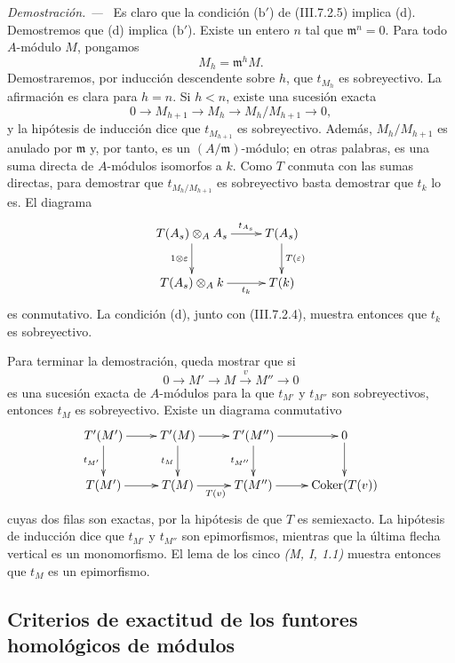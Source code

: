 \documentclass[10pt,oneside]{book}
\newcommand{\Coker}{\operatorname{Coker}}
\newcommand{\sref}[2][]{\textup{(#2)}}
\newcommand{\oldpage}[2][]{\setcounter{footnote}{0}\marginpar{\scriptsize\textbf{#1}~|~#2}\ignorespaces}
\newenvironment{proof}{\par\medskip\noindent\textit{Demostración. ---\ }}{\par}
\begin{document}
\begin{proof}
\oldpage[III]{180}
Es claro que la condición ($\mathrm{b}'$) de
\sref{III.7.2.5} implica (d). Demostremos que (d) implica
($\mathrm{b}'$). Existe un entero $n$ tal que
$\mathfrak m^n=0$. Para todo $A$-módulo $M$, pongamos
\[
  M_h=\mathfrak m^hM.
\]
Demostraremos, por inducción descendente sobre $h$, que $t_{M_h}$
es sobreyectivo. La afirmación es clara para $h=n$. Si $h<n$,
existe una sucesión exacta
\[
  0\longrightarrow M_{h+1}
  \longrightarrow M_h
  \longrightarrow M_h/M_{h+1}
  \longrightarrow0,
\]
y la hipótesis de inducción dice que $t_{M_{h+1}}$ es
sobreyectivo. Además, $M_h/M_{h+1}$ es anulado por $\mathfrak m$
y, por tanto, es un $(A/\mathfrak m)$-módulo; en otras palabras,
es una suma directa de $A$-módulos isomorfos a $k$. Como $T$
conmuta con las sumas directas, para demostrar que
$t_{M_h/M_{h+1}}$ es sobreyectivo basta demostrar que $t_k$ lo es.
El diagrama
\[
\xymatrix{
  T(A_s)\otimes_A A_s
    \ar[r]^-{t_{A_s}}\ar[d]_{1\otimes\varepsilon}
  & T(A_s)\ar[d]^{T(\varepsilon)}
  \\
  T(A_s)\otimes_A k
    \ar[r]_-{t_k}
  & T(k)
}
\]
es conmutativo. La condición (d), junto con
\sref{III.7.2.4}, muestra entonces que $t_k$ es sobreyectivo.

Para terminar la demostración, queda mostrar que si
\[
  0\longrightarrow M'
  \longrightarrow M
  \xrightarrow{v}M''
  \longrightarrow0
\]
es una sucesión exacta de $A$-módulos para la que $t_{M'}$ y
$t_{M''}$ son sobreyectivos, entonces $t_M$ es sobreyectivo.
Existe un diagrama conmutativo
\[
\xymatrix{
  T'(M')\ar[r]\ar[d]_{t_{M'}}
  & T'(M)\ar[r]\ar[d]_{t_M}
  & T'(M'')\ar[r]\ar[d]_{t_{M''}}
  & 0\ar[d]
  \\
  T(M')\ar[r]
  & T(M)\ar[r]_{T(v)}
  & T(M'')\ar[r]
  & \Coker(T(v))
}
\]
cuyas dos filas son exactas, por la hipótesis de que $T$ es
semiexacto. La hipótesis de inducción dice que $t_{M'}$ y
$t_{M''}$ son epimorfismos, mientras que la última flecha vertical
es un monomorfismo. El lema de los cinco \emph{(M, I, 1.1)}
muestra entonces que $t_M$ es un epimorfismo.
\end{proof}

\subsection{Criterios de exactitud de los funtores homológicos de módulos}
\label{subsection:III.7.3}
\end{document}
